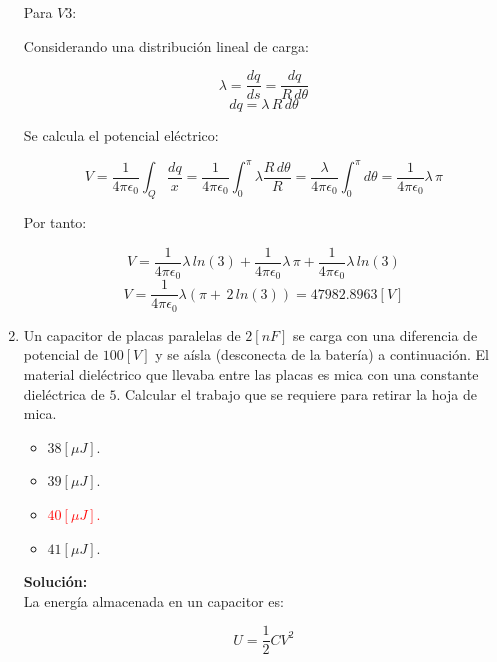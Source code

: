 \documentclass[letter,11pt]{article}
\begin{document}
\begin{enumerate}
Para $V3$:

Considerando una distribución lineal de carga:

\begin{equation*}
    \lambda = \frac{dq}{ds} = \frac{dq}{R\,d\theta}
\end{equation*}
\begin{equation*}
    dq = \lambda\,R\,d\theta
\end{equation*}

Se calcula el potencial eléctrico:

\begin{equation*}
    V = \frac{1}{4\pi\epsilon_0}\int_{Q}\frac{dq}{x}
      = \frac{1}{4\pi\epsilon_0}\int_{0}^{\pi}\lambda\frac{R\,d\theta}{R}
      = \frac{\lambda}{4\pi\epsilon_0}\int_{0}^{\pi}d\theta
      = \frac{1}{4\pi\epsilon_0}\lambda\,\pi
\end{equation*}

Por tanto:

\begin{equation*}
    V = \frac{1}{4\pi\epsilon_0}\lambda\,ln(3)
      + \frac{1}{4\pi\epsilon_0}\lambda\,\pi
      + \frac{1}{4\pi\epsilon_0}\lambda\,ln(3)
\end{equation*}
\begin{equation*}
    V = \frac{1}{4\pi\epsilon_0}\lambda(\pi+\,2\,ln(3))
      = 47982.8963 [V]
\end{equation*}

\item Un capacitor de placas paralelas de $2 [nF]$ se carga con una diferencia
de potencial de $100 [V]$ y se aísla (desconecta de la batería) a continuación.
El material dieléctrico que llevaba entre las placas es mica con una constante
dieléctrica de $5$. Calcular el trabajo que se requiere para retirar la hoja de
mica.

\begin{itemize}
    \item $38 [\mu J]$.
    \item $39 [\mu J]$.
    \item \textcolor{red}{$40 [\mu J]$.}
    \item $41 [\mu J]$.
\end{itemize}

\textbf{Solución:} \\

La energía almacenada en un capacitor es:

\begin{equation*}
    U = \frac{1}{2}CV^2
\end{equation*}


\end{enumerate}
\end{document}
